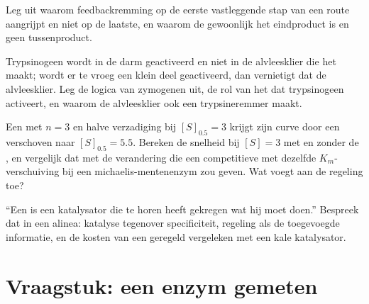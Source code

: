 \begin{exercise}[$\star\star$]\label{exo:b1:enzymes:9}
Leg uit waarom feedbackremming op de eerste vastleggende stap van een route
aangrijpt en niet op de laatste, en waarom de  gewoonlijk het eindproduct is
en geen tussenproduct.
\end{exercise}

\begin{exercise}[$\star\star\star$]\label{exo:b1:enzymes:10}
Trypsinogeen wordt in de darm geactiveerd en niet in de alvleesklier die het
maakt; wordt er te vroeg een klein deel geactiveerd, dan vernietigt dat de
alvleesklier. Leg de logica van zymogenen uit, de rol van het  dat
trypsinogeen activeert, en waarom de alvleesklier ook een trypsineremmer maakt.
\end{exercise}

\begin{exercise}[$\star\star\star$]\label{exo:b1:enzymes:11}
Een  met $n = 3$ en halve verzadiging bij $[S]_{0.5}
= 3$ krijgt zijn curve door een  verschoven naar $[S]_{0.5} = 5.5$. Bereken
de snelheid bij $[S] = 3$ met en zonder de , en vergelijk dat met de
verandering die een competitieve  met dezelfde $K_m$-verschuiving bij een
michaelis-mentenenzym zou geven. Wat voegt  aan de regeling toe?
\end{exercise}

\begin{exercise}[$\star\star\star$]\label{exo:b1:enzymes:12}
``Een  is een katalysator die te horen heeft gekregen wat hij moet doen.''
Bespreek dat in een alinea: katalyse tegenover specificiteit, regeling als de
toegevoegde informatie, en de kosten van een geregeld  vergeleken met een
kale katalysator.
\end{exercise}

\section{Vraagstuk: een enzym gemeten}

